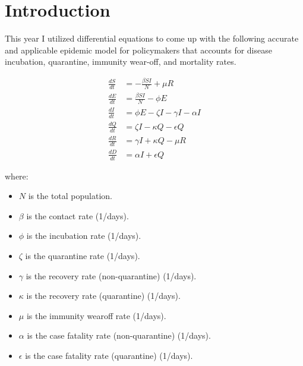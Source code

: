 \documentclass{article}
\theoremstyle{definition}
\begin{document}


\tableofcontents
\newpage

\section{Introduction}
\label{section:introduction}
This year I utilized differential equations to come up with the following accurate and applicable epidemic model for policymakers that accounts for disease incubation, quarantine, immunity wear-off, and mortality rates.

\begin{align}        
    \frac{dS}{dt} &= -\frac{\beta S I}{N} + \mu R \\
    \frac{dE}{dt} &= \frac{\beta S I}{N} - \phi E \\
    \frac{dI}{dt} &= \phi E - \zeta I - \gamma I - \alpha I \\
    \frac{dQ}{dt} &= \zeta I - \kappa Q - \epsilon Q \\
    \frac{dR}{dt} &= \gamma I + \kappa Q - \mu R \\
    \frac{dD}{dt} &= \alpha I + \epsilon Q
\end{align}

\noindent
where:
\begin{itemize}
    \item $N$ is the total population.
    \item $\beta$ is the contact rate (1/days).
    \item $\phi$ is the incubation rate (1/days).
    \item $\zeta$ is the quarantine rate (1/days).
    \item $\gamma$ is the recovery rate (non-quarantine) (1/days).
    \item $\kappa$ is the recovery rate (quarantine) (1/days).
    \item $\mu$ is the immunity wearoff rate (1/days).
    \item $\alpha$ is the case fatality rate (non-quarantine) (1/days).
    \item $\epsilon$ is the case fatality rate (quarantine) (1/days).
\end{itemize}





\end{document}
